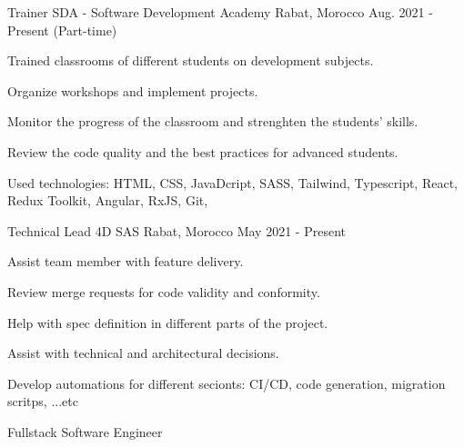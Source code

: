 

\begin{cventries}

  \cventry
    {Trainer} %
    {SDA - Software Development Academy} %
    {Rabat, Morocco} %
    {Aug. 2021 - Present (Part-time)} %
    {
      \begin{cvitems} %
        \item {Trained classrooms of different students on development subjects.}
        \item {Organize workshops and implement projects.}
        \item {Monitor the progress of the classroom and strenghten the students' skills.}
        \item {Review the code quality and the best practices for advanced students.}
        \item {Used technologies: HTML, CSS, JavaDcript, SASS, Tailwind, Typescript, React, Redux Toolkit, Angular, RxJS, Git,}
      \end{cvitems}
    }
  \cventry
    {Technical Lead} %
    {4D SAS} %
    {Rabat, Morocco} %
    {May 2021 - Present} %
    {
      \begin{cvitems} %
        \item {Assist team member with feature delivery.}
        \item {Review merge requests for code validity and conformity.}
        \item {Help with spec definition in different parts of the project.}
        \item {Assist with technical and architectural decisions.}
        \item {Develop automations for different secionts: CI/CD, code generation, migration scritps, ...etc}
      \end{cvitems}
    }
  \cventry
    {Fullstack Software Engineer} %

\end{cventries}
